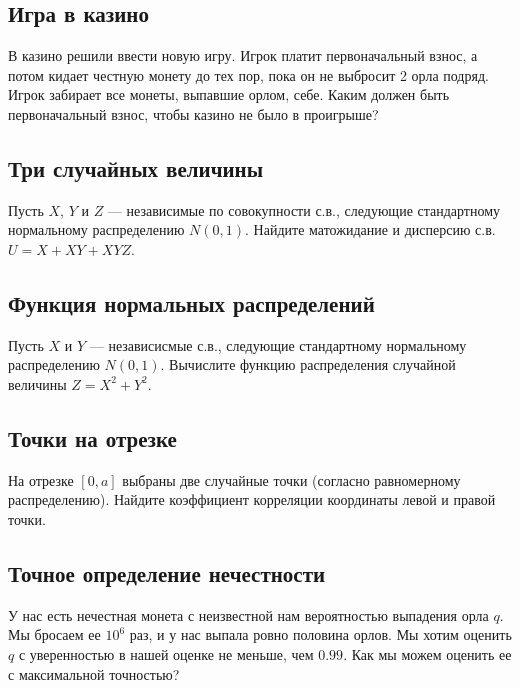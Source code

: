 \documentclass[12pt]{article}
\begin{document}
\subsection{Игра в казино}

В казино решили ввести новую игру. Игрок платит первоначальный взнос, а потом кидает честную монету до тех пор, пока он не выбросит 2 орла подряд. Игрок забирает все монеты, выпавшие орлом, себе. Каким должен быть первоначальный взнос, чтобы казино не было в проигрыше?



\subsection{Три случайных величины}

Пусть $X$, $Y$ и $Z$ --- независимые по совокупности с.в., следующие стандартному нормальному распределению $N(0, 1)$. Найдите матожидание и дисперсию с.в. $U = X + XY + XYZ$. 



\subsection{Функция нормальных распределений}

Пусть $X$ и $Y$ --- независисмые с.в., следующие стандартному нормальному распределению $N(0, 1)$. Вычислите функцию распределения случайной величины $Z = X^2 + Y^2$.



\subsection{Точки на отрезке}

На отрезке $[0, a]$ выбраны две случайные точки (согласно равномерному распределению). Найдите коэффициент корреляции координаты левой и правой точки. 



\subsection{Точное определение нечестности}

У нас есть нечестная монета с неизвестной нам вероятностью выпадения орла $q$. Мы бросаем ее $10^6$ раз, и у нас выпала ровно половина орлов. Мы хотим оценить $q$ с уверенностью в нашей оценке не меньше, чем $0.99$. Как мы можем оценить ее с максимальной точностью? 
\end{document}
